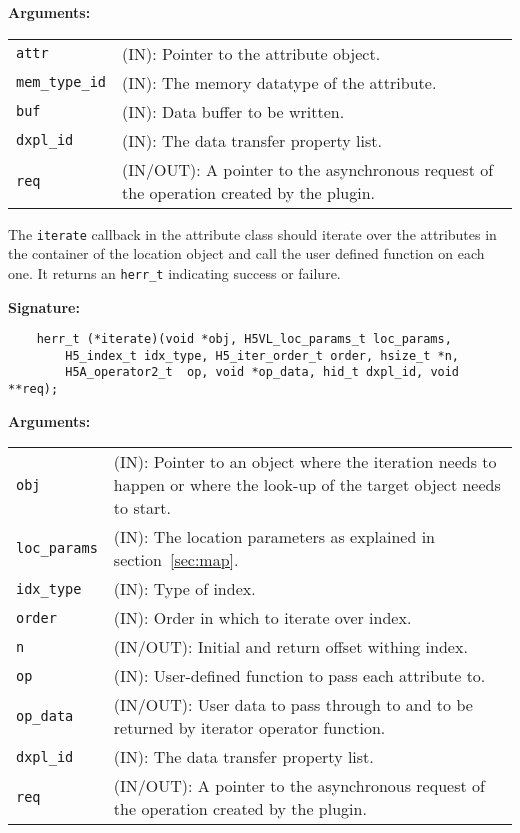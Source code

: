 \textbf{Arguments:}\\
\begin{tabular}{l p{10cm}}
  {\tt attr} & (IN): Pointer to the attribute object.\\
  {\tt mem\_type\_id} & (IN): The memory datatype of the attribute.\\
  {\tt buf} & (IN): Data buffer to be written.\\
  {\tt dxpl\_id} & (IN): The data transfer property list.\\
  {\tt req} & (IN/OUT): A pointer to the asynchronous request of the
  operation created by the plugin.\\
\end{tabular}

The {\tt iterate} callback in the attribute class should iterate over
the attributes in the container of the location object and call the
user defined function on each one. It returns an {\tt herr\_t}
indicating success or failure.

\textbf{Signature:}
\begin{lstlisting}
    herr_t (*iterate)(void *obj, H5VL_loc_params_t loc_params,
        H5_index_t idx_type, H5_iter_order_t order, hsize_t *n, 
        H5A_operator2_t  op, void *op_data, hid_t dxpl_id, void **req);
\end{lstlisting}

\textbf{Arguments:}\\
\begin{tabular}{l p{10cm}}
  {\tt obj} & (IN): Pointer to an object where the iteration needs
  to happen or where the look-up of the target object needs to
  start.\\
  {\tt loc\_params} & (IN): The location parameters as
  explained in section~\ref{sec:map}.\\
  {\tt idx\_type} & (IN): Type of index.\\
  {\tt order} & (IN): Order in which to iterate over index.\\
  {\tt n} & (IN/OUT): Initial and return offset withing index.\\
  {\tt op} & (IN): User-defined function to pass each
  attribute to. \\
  {\tt op\_data} & (IN/OUT): User data to pass through to and to be
  returned by iterator operator function. \\
  {\tt dxpl\_id} & (IN): The data transfer property list.\\
  {\tt req} & (IN/OUT): A pointer to the asynchronous request of the
  operation created by the plugin.\\
\end{tabular}

